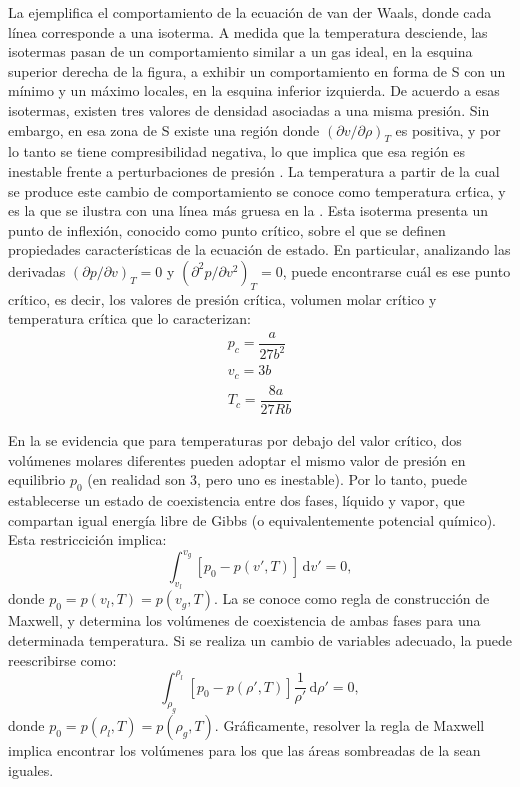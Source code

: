 La  ejemplifica el comportamiento de la ecuaci\'on de van der Waals, donde cada l\'inea corresponde a una isoterma. A medida que la temperatura desciende, las isotermas pasan de un comportamiento similar a un gas ideal, en la esquina superior derecha de la figura, a exhibir un comportamiento en forma de S con un m\'inimo y un m\'aximo locales, en la esquina inferior izquierda. De acuerdo a esas isotermas, existen tres valores de densidad asociadas a una misma presi\'on. Sin embargo, en esa zona de S existe una regi\'on donde $(\partial v / \partial \rho)_T$ es positiva, y por lo tanto se tiene compresibilidad negativa, lo que implica que esa regi\'on es inestable frente a perturbaciones de presi\'on \cite{burden_numerical_2011}.
La temperatura a partir de la cual se produce este cambio de comportamiento se conoce como temperatura cr\'tica, y es la que se ilustra con una l\'inea m\'as gruesa en la . Esta isoterma presenta un punto de inflexi\'on, conocido como punto cr\'itico, sobre el que se definen propiedades caracter\'isticas de la ecuaci\'on de estado. En particular, analizando las derivadas $(\partial p / \partial v)_T = 0$ y $(\partial^2 p / \partial v^2)_T = 0$, puede encontrarse cu\'al es ese punto cr\'itico, es decir, los valores de presi\'on cr\'itica, volumen molar cr\'itico y temperatura cr\'itica que lo caracterizan:
\begin{equation}
	\begin{gathered}
		p_c = \dfrac{a}{27 b^2} \\
		v_c = 3b \\
		T_c = \dfrac{8 a}{27 R b}
	\end{gathered}
	\label{eq:vdw_param_crit}
\end{equation}

En la  se evidencia que para temperaturas por debajo del valor cr\'itico, dos vol\'umenes molares diferentes pueden adoptar el mismo valor de presi\'on en equilibrio $p_0$ (en realidad son 3, pero uno es inestable). Por lo tanto, puede establecerse un estado de coexistencia entre dos fases, l\'iquido y vapor, que compartan igual energ\'ia libre de Gibbs (o equivalentemente potencial qu\'imico). Esta restriccici\'on implica:
\begin{equation}
	\int_{v_l}^{v_g} \left[p_0 - p(v',T)\right] \, \mbox{d} v' = 0,
	\label{eq:maxwell_constr}
\end{equation}
donde $p_0 = p(v_l,T) = p(v_g,T)$. La  se conoce como regla de construcci\'on de Maxwell, y determina los vol\'umenes de coexistencia de ambas fases para una determinada temperatura. Si se realiza un cambio de variables adecuado, la  puede reescribirse como:
\begin{equation}
	\int_{\rho_g}^{\rho_l} \left[p_0 - p(\rho',T)\right] \dfrac{1}{\rho'} \, \mbox{d} \rho' = 0,
	\label{eq:maxwell_constr_rho}
\end{equation}
donde $p_0 = p(\rho_l,T) = p(\rho_g,T)$. Gr\'aficamente, resolver la regla de Maxwell implica encontrar los vol\'umenes para los que las \'areas sombreadas de la  sean iguales. 

